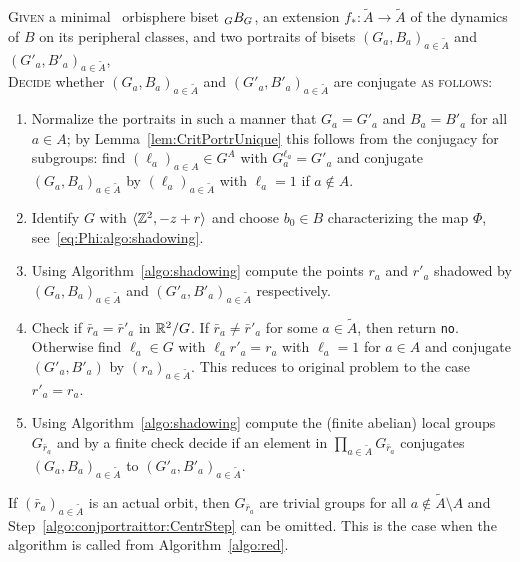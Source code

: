 \documentclass{amsart}
\newcommand\wtA{{\widetilde A}}
\begin{document}
\begin{algo}\label{algo:conjportraittor}
  \textsc{Given} a minimal \Tor\ orbisphere biset $\subscript G B_G$, an extension $f_*\colon\wtA\to\wtA$ of the dynamics of $B$ on its peripheral classes, and two portraits of bisets $(G_a,B_a)_{a\in\wtA}$ and $(G'_a,B'_a)_{a\in\wtA}$,\\
  \textsc{Decide} whether $(G_a,B_a)_{a\in\wtA}$ and
  $(G'_a,B'_a)_{a\in\wtA}$ are conjugate \textsc{as follows:}
  \begin{enumerate}
  \item Normalize the portraits in such a manner that $G_a=G'_a$ and
    $B_a=B'_a$ for all $a\in A$; by Lemma~\ref{lem:CritPortrUnique}
    this follows from the conjugacy for subgroups: find
    $(\ell_a)_{a\in A}\in G^A$ with $G^{\ell_a}_a=G'_a$ and conjugate
    $(G_a,B_a)_{a\in\wtA}$ by $(\ell_a)_{a\in \wtA}$
    with $\ell_a=1$ if $a\not\in A$.
  \item Identify $G$ with $\langle {\mathbb Z}^2,-z+r \rangle$ and choose
    $b_0\in B$ characterizing the map $\Phi$,
    see~\eqref{eq:Phi:algo:shadowing}.
  \item Using Algorithm~\ref{algo:shadowing} compute the points $r_a$
    and $r'_a$ shadowed by $(G_a,B_a)_{a\in\wtA}$ and
    $(G'_a,B'_a)_{a\in\wtA}$ respectively.
  \item Check if $\bar r_a=\bar r'_a$ in ${\mathbb R}^2/G$. If
    $\bar r_a\neq\bar r'_a$ for some $a\in\wtA$, then return
    \texttt{no}.  Otherwise find $\ell_a\in G$ with $\ell_a r'_a= r_a$
    with $\ell_a=1$ for $a\in A$ and conjugate $(G'_a,B'_a)$ by
    $(r_a)_{a\in \wtA}$. This reduces to original problem to
    the case $r'_a=r_a$.
  \item Using Algorithm~\ref{algo:shadowing} compute the (finite
    abelian) local groups $G_{\bar r_a}$ and by a finite check decide
    if an element in $\prod_{a\in\wtA}G_{\bar r_a}$ conjugates
    $(G_a,B_a)_{a\in\wtA}$ to
    $(G'_a,B'_a)_{a\in\wtA}$.
  \label{algo:conjportraittor:CentrStep}
  \end{enumerate}
\end{algo}
If $(\bar r_a)_{a\in \wtA}$ is an actual orbit, then
$G_{\bar r_a}$ are trivial groups for all
$a\not\in \wtA\setminus A$ and
Step~\eqref{algo:conjportraittor:CentrStep} can be omitted. This is
the case when the algorithm is called from Algorithm~\ref{algo:red}.
\end{document}
